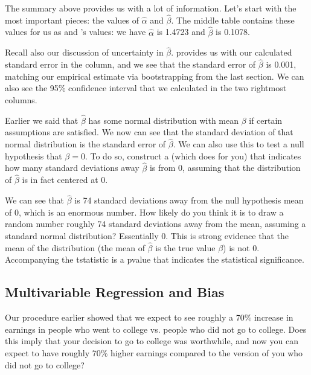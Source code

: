 \documentclass[letterpaper,10pt,english]{jupyterBook}
\begin{document}
\sphinxAtStartPar
The summary above provides us with a lot of information. Let’s start with the most important pieces: the values of \(\hat{\alpha}\) and \(\hat{\beta}\). The middle table contains these values for us as  and ’s  values: we have \(\hat{\alpha}\) is 1.4723 and \(\hat{\beta}\) is 0.1078.

\sphinxAtStartPar
Recall also our discussion of uncertainty in \(\hat{\beta}\).  provides us with our calculated standard error in the  column, and we see that the standard error of \(\hat{\beta}\) is 0.001, matching our empirical estimate via bootstrapping from the last section. We can also see the 95\% confidence interval that we calculated in the two rightmost columns.

\sphinxAtStartPar
{}

\sphinxAtStartPar
Earlier we said that \(\hat{\beta}\) has some normal distribution with mean \(\beta\) if certain assumptions are satisfied. We now can see that the standard deviation of that normal distribution is the standard error of \(\hat{\beta}\). We can also use this to test a null hypothesis that \(\beta = 0\). To do so, construct a  (which  does for you) that indicates how many standard deviations away \(\hat{\beta}\) is from 0, assuming that the distribution of \(\hat{\beta}\) is in fact centered at 0.

\sphinxAtStartPar
We can see that \(\hat{\beta}\) is 74 standard deviations away from the null hypothesis mean of 0, which is an enormous number. How likely do you think it is to draw a random number roughly 74 standard deviations away from the mean, assuming a standard normal distribution? Essentially 0. This is strong evidence that the mean of the distribution (the mean of \(\hat{\beta}\) is the true value \(\beta\)) is not 0. Accompanying the t\sphinxhyphen{}statistic is a p\sphinxhyphen{}value that indicates the statistical significance.


\subsection{Multivariable Regression and Bias}
\label{\detokenize{content/11-econometrics/multivariable:multivariable-regression-and-bias}}\label{\detokenize{content/11-econometrics/multivariable::doc}}
\sphinxAtStartPar
Our procedure earlier showed that we expect to see roughly a 70\% increase in earnings in people who went to college vs. people who did not go to college. Does this imply that your decision to go to college was worthwhile, and now you can expect to have roughly 70\% higher earnings compared to the version of you who did not go to college?
\end{document}
